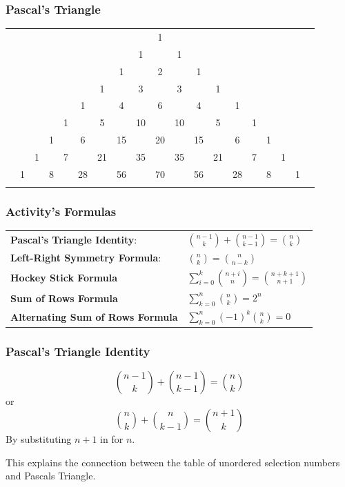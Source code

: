 \documentclass[xcolor=table]{beamer}
\begin{document}
\frame
{
  \frametitle{Pascal's Triangle}
\footnotesize


\begin{tabular}{rcccccccccccccccccc}
&&&&&    &    &    &    &  1\\\noalign{\smallskip\smallskip}
&&&&&   &    &    &  1 &    &  1\\\noalign{\smallskip\smallskip}
&&&&&    &    &  \cellcolor{green!25}1 &    & \cellcolor{green!25} 2 &    & \cellcolor{yellow!25}  1\\\noalign{\smallskip\smallskip}
&&&&&    &  1 &    & \cellcolor{green!25} 3 &    &  \cellcolor{yellow!25}3 &    &  1\\\noalign{\smallskip\smallskip}
&&&& & 1 &    &  4 &    &  \cellcolor{yellow!25}6 &    &  4 &    &  1\\\noalign{\smallskip\smallskip}
&&&&1&  &5 &    &  10 &    &  \cellcolor{yellow!25}10 &    &  5 &    &  1\\\noalign{\smallskip\smallskip}
&&&1&  &6 &    &  15 &    &  20 &    &  15 &    &  6 &&1\\\noalign{\smallskip\smallskip}
&&1&  &7 &    & \cellcolor{blue!25} 21 &    &  35 &    &  35 &    & \cellcolor{blue!25} 21&&7&&1\\\noalign{\smallskip\smallskip}
&1&  &8&    &  28 &    &  56 &    & 70 &    &  56&&28&&8&&1\\\noalign{\smallskip\smallskip}
\end{tabular}

}


\begin{frame}
\frametitle{Activity's Formulas}

\begin{tabular}{l<{\onslide<2->}l<{\onslide}}
{\bf Pascal's Triangle Identity}: &$\binom{n-1}{k}+\binom{n-1}{k-1}=\binom{n}{k}$\\
{\bf Left-Right Symmetry Formula}: &$\binom{n}{k}=\binom{n}{n-k}$\\
{\bf Hockey Stick Formula} &$\sum_{i=0}^{k}\binom{n+i}{n}=\binom{n+k+1}{n+1}$\\
{\bf Sum of Rows Formula} & $\sum_{k=0}^{n}\binom{n}{k}=2^n$\\
{\bf Alternating Sum of Rows Formula} &$\sum_{k=0}^{n}(-1)^k\binom{n}{k}=0$\\
\end{tabular}

\end{frame}

\frame
{
  \frametitle{Pascal's Triangle Identity}

$$\binom{n-1}{k}+\binom{n-1}{k-1}=\binom{n}{k}$$ \vfill
or
$$\binom{n}{k}+\binom{n}{k-1}=\binom{n+1}{k}$$
By substituting $n+1$ in for $n$. \vfill

This explains the connection between the table of unordered selection numbers and Pascals Triangle.
}
\end{document}
